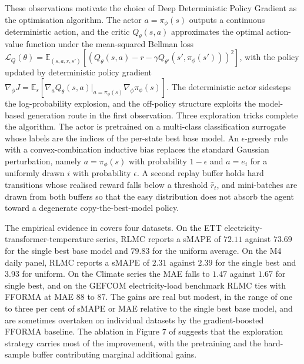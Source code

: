 These observations motivate the choice of Deep Deterministic Policy Gradient
\citep{LillicrapDDPG2016} as the optimisation algorithm. The actor
$a = \pi_\phi(s)$ outputs a continuous deterministic action, and the critic
$Q_\theta(s, a)$ approximates the optimal action-value function under the
mean-squared Bellman loss
$\mathcal L_Q(\theta) = \mathbb E_{(s,a,r,s')}[ (Q_\theta(s,a) - r - \gamma
Q_{\theta'}(s', \pi_\phi(s')))^2 ]$, with the policy updated by deterministic
policy gradient
$\nabla_\phi J = \mathbb E_s[ \nabla_a Q_\theta(s, a)\rvert_{a = \pi_\phi(s)}
\nabla_\phi \pi_\phi(s) ]$. The deterministic actor sidesteps the log-probability
explosion, and the off-policy structure exploits the model-based generation route
in the first observation. Three exploration tricks complete the algorithm. The
actor is pretrained on a multi-class classification surrogate whose labels are
the indices of the per-state best base model. An $\epsilon$-greedy rule with a
convex-combination inductive bias replaces the standard Gaussian perturbation,
namely $a = \pi_\phi(s)$ with probability $1 - \epsilon$ and $a = e_i$ for a
uniformly drawn $i$ with probability $\epsilon$. A second replay buffer holds
hard transitions whose realised reward falls below a threshold $\hat r_t$, and
mini-batches are drawn from both buffers so that the easy distribution does not
absorb the agent toward a degenerate copy-the-best-model policy.

The empirical evidence in \citet{Fu2022} covers four datasets. On the ETT
electricity-transformer-temperature series, RLMC reports a sMAPE of $72.11$ against
$73.69$ for the single best base model and $79.83$ for the uniform average. On
the M4 daily panel, RLMC reports a sMAPE of $2.31$ against $2.39$ for the single
best and $3.93$ for uniform. On the Climate series the MAE falls to $1.47$ against
$1.67$ for single best, and on the GEFCOM electricity-load benchmark RLMC ties
with FFORMA at MAE $88$ to $87$. The gains are real but modest, in the range of
one to three per cent of sMAPE or MAE relative to the single best base model,
and are sometimes overtaken on individual datasets by the gradient-boosted
FFORMA baseline. The ablation in Figure 7 of \citet{Fu2022} suggests that the
exploration strategy carries most of the improvement, with the pretraining and
the hard-sample buffer contributing marginal additional gains.

